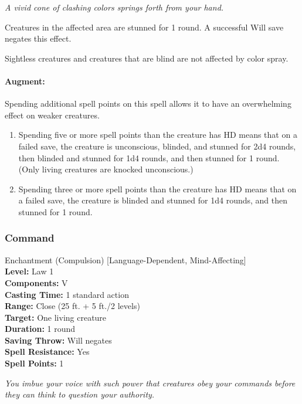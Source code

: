 \emph{A vivid cone of clashing colors springs forth from your hand.}

Creatures in the affected area are stunned for 1 round.
A successful Will save negates this effect.

Sightless creatures and creatures that are blind are not affected by color spray.

\paragraph{Augment:} Spending additional spell points on this spell allows it to have an overwhelming effect on weaker creatures.

\begin{enumerate}
\item Spending five or more spell points than the creature has HD means that on a failed save,
the creature is unconscious, blinded, and stunned for 2d4 rounds, then blinded and stunned for 1d4 rounds, and then stunned for 1 round. 
(Only living creatures are knocked unconscious.)
\item Spending three or more spell points than the creature has HD means that on a failed save, 
the creature is blinded and stunned for 1d4 rounds, and then stunned for 1 round. 
\end{enumerate}
\subsubsection{Command}
\label{Spell:Command}
Enchantment (Compulsion) [Language-Dependent, Mind-Affecting]
\\ \textbf{Level:} Law 1
\\ \textbf{Components:} V
\\ \textbf{Casting Time:} 1 standard action
\\ \textbf{Range:} Close (25 ft. + 5 ft./2 levels)
\\ \textbf{Target:} One living creature
\\ \textbf{Duration:} 1 round
\\ \textbf{Saving Throw:} Will negates
\\ \textbf{Spell Resistance:} Yes
\\ \textbf{Spell Points:} 1

\emph{You imbue your voice with such power that creatures obey your commands before they can think to question your authority.}

